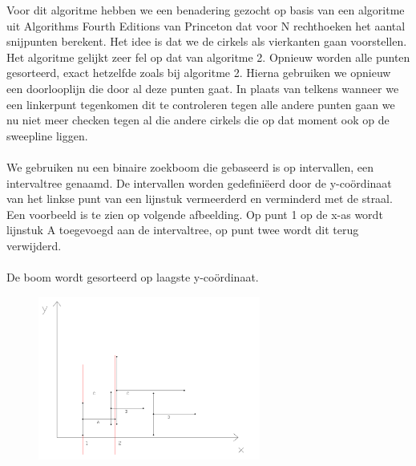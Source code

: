\documentclass[11pt,a4paper]{article}
\begin{document}
Voor dit algoritme hebben we een benadering gezocht op basis van een algoritme uit Algorithms Fourth Editions van Princeton dat voor N rechthoeken het aantal snijpunten berekent. Het idee is dat we de cirkels als vierkanten gaan voorstellen. Het algoritme gelijkt zeer fel op dat van algoritme 2. Opnieuw worden alle punten gesorteerd, exact hetzelfde zoals bij algoritme 2. Hierna gebruiken we opnieuw een doorlooplijn die door al deze punten gaat. In plaats van telkens wanneer we een linkerpunt tegenkomen dit te controleren tegen alle andere punten gaan we nu niet meer checken tegen al die andere cirkels die op dat moment ook op de sweepline liggen.\\
\\
We gebruiken nu een binaire zoekboom die gebaseerd is op intervallen, een intervaltree genaamd. De intervallen worden gedefiniëerd door de y-co\"ordinaat van het linkse punt van een lijnstuk vermeerderd en verminderd met de straal. Een voorbeeld is te zien op volgende afbeelding. Op punt 1 op de x-as wordt lijnstuk A toegevoegd aan de intervaltree, op punt twee wordt dit terug verwijderd.
\\
\\
De boom wordt gesorteerd op laagste y-co\"ordinaat.
\begin{figure}[H]
\centering
\includegraphics[width=0.65\textwidth]{algo3.png}
\end{figure}
\end{document}
